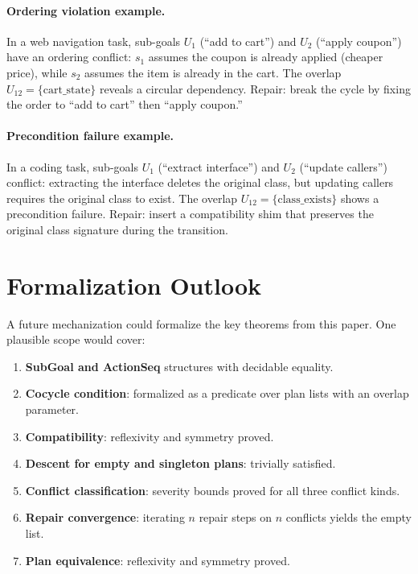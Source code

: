 \documentclass[11pt]{article}
\newcommand{\SubGoal}[1]{U_{#1}}
\begin{document}
\paragraph{Ordering violation example.}
In a web navigation task, sub-goals $\SubGoal{1}$ (``add to cart'')
and $\SubGoal{2}$ (``apply coupon'') have an ordering conflict:
$s_1$ assumes the coupon is already applied (cheaper price),
while $s_2$ assumes the item is already in the cart.  The overlap
$\SubGoal{12} = \{\text{cart\_state}\}$ reveals a circular
dependency.  Repair: break the cycle by fixing the order to
``add to cart'' then ``apply coupon.''

\paragraph{Precondition failure example.}
In a coding task, sub-goals $\SubGoal{1}$ (``extract interface'')
and $\SubGoal{2}$ (``update callers'') conflict: extracting the
interface deletes the original class, but updating callers requires
the original class to exist.  The overlap
$\SubGoal{12} = \{\text{class\_exists}\}$ shows a precondition
failure.  Repair: insert a compatibility shim that preserves
the original class signature during the transition.

\section{Formalization Outlook}\label{app:lean}

A future mechanization could formalize the key theorems from this paper.
One plausible scope would cover:

\begin{enumerate}[leftmargin=*,itemsep=2pt]
  \item \textbf{SubGoal and ActionSeq} structures with decidable
    equality.
  \item \textbf{Cocycle condition}: formalized as a predicate over
    plan lists with an overlap parameter.
  \item \textbf{Compatibility}: reflexivity and symmetry proved.
  \item \textbf{Descent for empty and singleton plans}: trivially
    satisfied.
  \item \textbf{Conflict classification}: severity bounds proved
    for all three conflict kinds.
  \item \textbf{Repair convergence}: iterating $n$ repair steps
    on $n$ conflicts yields the empty list.
  \item \textbf{Plan equivalence}: reflexivity and symmetry proved.
\end{enumerate}
\end{document}
